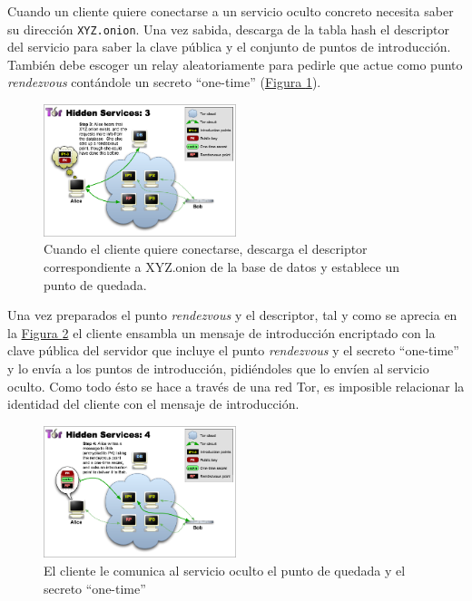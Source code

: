 \documentclass[10pt,a4paper,spanish]{article}
\begin{document}
Cuando un cliente quiere conectarse a un servicio oculto concreto necesita saber su dirección \texttt{XYZ.onion}. Una vez sabida, descarga de la tabla hash el descriptor del servicio para saber la clave pública y el conjunto de puntos de introducción. También debe escoger un relay aleatoriamente para pedirle que actue como punto \textit{rendezvous} contándole un secreto ``one-time'' (\hyperref[ths3]{Figura \ref*{ths3}}).

\begin{figure}[!h]
    \centering
    \includegraphics[width=0.5\textwidth]{THS-3}
    \caption{Cuando el cliente quiere conectarse, descarga el descriptor correspondiente a XYZ.onion de la base de datos y establece un punto de quedada.}
    \label{ths3}
\end{figure}

Una vez preparados el punto \textit{rendezvous} y el descriptor, tal y como se aprecia en la \hyperref[ths4]{Figura \ref*{ths4}} el cliente ensambla un mensaje de introducción encriptado con la clave pública del servidor que incluye el punto \textit{rendezvous} y el secreto ``one-time'' y lo envía a los puntos de introducción, pidiéndoles que lo envíen al servicio oculto. Como todo ésto se hace a través de una red Tor, es imposible relacionar la identidad del cliente con el mensaje de introducción.

\begin{figure}[!h]
    \centering
    \includegraphics[width=0.5\textwidth]{THS-4}
    \caption{El cliente le comunica al servicio oculto el punto de quedada y el secreto ``one-time''}
    \label{ths4}
\end{figure}
\end{document}
